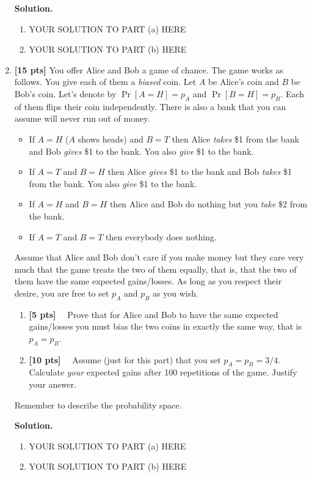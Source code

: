 \documentclass[11pt]{article}
\newcommand{\points}[1]{\textbf{[#1 pts]}}
\begin{document}
\begin{enumerate}
\textbf{Solution.} 
\begin{enumerate}
    \item YOUR SOLUTION TO PART (a) HERE
    \item YOUR SOLUTION TO PART (b) HERE
\end{enumerate}

\bigskip


\item \points{15} 
You offer Alice and Bob a game of chance. The game works as follows. You give each of them 
a \emph{biased} coin. Let $A$ be Alice's coin and $B$ be Bob's coin. Let's denote by $\Pr[A=H]=p_A$ and $\Pr[B=H]=p_B$.
Each of them flips their coin independently. There is also a bank that you can assume will never run out of money.
\begin{itemize}
\item If $A=H$ ($A$ shows heads) and $B=T$ then Alice \emph{takes} \$1 from the bank and Bob \emph{gives} \$1 to the bank. You also \emph{give} \$1 to the bank.
\item If $A=T$ and $B=H$ then Alice \emph{gives} \$1 to the bank
and Bob \emph{takes} \$1 from the bank. You also \emph{give} \$1 to the bank.
\item If $A=H$ and $B=H$ then Alice and Bob do nothing but you \emph{take} \$2 from the bank. 
\item If $A=T$ and $B=T$ then everybody does nothing.
\end{itemize}
Assume that Alice and Bob don't care if you make money but they care very much that the game treats the two of them equally, that is, that the two of them have the same expected gains/losses. As long as you respect their desire, you are free to set $p_A$ and $p_B$ as you wish.
\begin{enumerate}
    \item \points{5}~~ Prove that for Alice and Bob to have the same expected 
    gains/losses you must bias the two coins in exactly the same way, that is $p_A=p_B$.
    \item \points{10}~~ Assume (just for this part) that you set $p_A=p_B=3/4$.
    Calculate \emph{your} expected gains after 100 repetitions of the game. Justify your answer.
\end{enumerate}
Remember to describe the probability space.

\textbf{Solution.}
\begin{enumerate}
    \item YOUR SOLUTION TO PART (a) HERE
    \item YOUR SOLUTION TO PART (b) HERE
\end{enumerate}



\end{enumerate}
\end{document}
